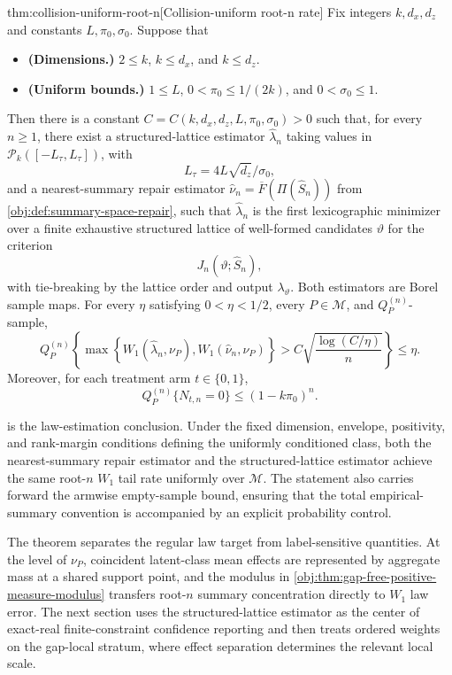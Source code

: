 \begin{theoremv}{thm:collision-uniform-root-n}[Collision-uniform root-n rate]
Fix integers \(k,d_x,d_z\) and constants \(L,\pi_0,\sigma_0\).  Suppose that
\begin{itemize}
\item \textbf{(Dimensions.)} \(2\le k\), \(k\le d_x\), and \(k\le d_z\).
\item \textbf{(Uniform bounds.)} \(1\le L\), \(0<\pi_0\le 1/(2k)\), and \(0<\sigma_0\le 1\).
\end{itemize}
Then there is a constant \(C=C(k,d_x,d_z,L,\pi_0,\sigma_0)>0\) such that, for every \(n\ge 1\), there exist a structured-lattice estimator \(\widehat\lambda_n\) taking values in \(\mathcal P_k([-L_\tau,L_\tau])\), with
\[
L_\tau=4L\sqrt{d_z}/\sigma_0,
\]
and a nearest-summary repair estimator \(\widehat\nu_n=\overline F(\Pi(\widehat S_n))\) from \cref{obj:def:summary-space-repair}, such that \(\widehat\lambda_n\) is the first lexicographic minimizer over a finite exhaustive structured lattice of well-formed candidates \(\vartheta\) for the criterion
\[
J_n(\vartheta;\widehat S_n),
\]
with tie-breaking by the lattice order and output \(\lambda_\vartheta\).  Both estimators are Borel sample maps.  For every \(\eta\) satisfying \(0<\eta<1/2\), every \(P\in\mathcal M\), and \(Q_P^{(n)}\)-sample,
\[
Q_P^{(n)}\!\left\{
\max\!\left\{
W_1(\widehat\lambda_n,\nu_P),
W_1(\widehat\nu_n,\nu_P)
\right\}
>
C\sqrt{\frac{\log(C/\eta)}{n}}
\right\}\le \eta .
\]
Moreover, for each treatment arm \(t\in\{0,1\}\),
\[
Q_P^{(n)}\{N_{t,n}=0\}\le (1-k\pi_0)^n .
\]
\end{theoremv}

 is the law-estimation conclusion. Under the fixed dimension, envelope, positivity, and rank-margin conditions defining the uniformly conditioned class, both the nearest-summary repair estimator and the structured-lattice estimator achieve the same root-\(n\) \(W_1\) tail rate uniformly over \(\mathcal M\). The statement also carries forward the armwise empty-sample bound, ensuring that the total empirical-summary convention is accompanied by an explicit probability control.

The theorem separates the regular law target from label-sensitive quantities. At the level of \(\nu_P\), coincident latent-class mean effects are represented by aggregate mass at a shared support point, and the modulus in \cref{obj:thm:gap-free-positive-measure-modulus} transfers root-\(n\) summary concentration directly to \(W_1\) law error. The next section uses the structured-lattice estimator as the center of exact-real finite-constraint confidence reporting and then treats ordered weights on the gap-local stratum, where effect separation determines the relevant local scale.
